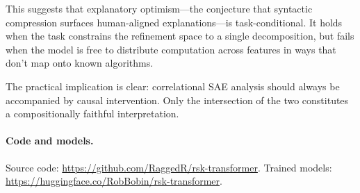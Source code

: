\documentclass[10pt]{article}
\begin{document}
This suggests that explanatory optimism---the conjecture that syntactic
compression surfaces human-aligned explanations---is task-conditional. It
holds when the task constrains the refinement space to a single
decomposition, but fails when the model is free to distribute computation
across features in ways that don't map onto known algorithms.

The practical implication is clear: correlational SAE analysis should always
be accompanied by causal intervention. Only the intersection of the two
constitutes a compositionally faithful interpretation.

\paragraph{Code and models.}
Source code: \url{https://github.com/RaggedR/rsk-transformer}.
Trained models: \url{https://huggingface.co/RobBobin/rsk-transformer}.


\end{document}
